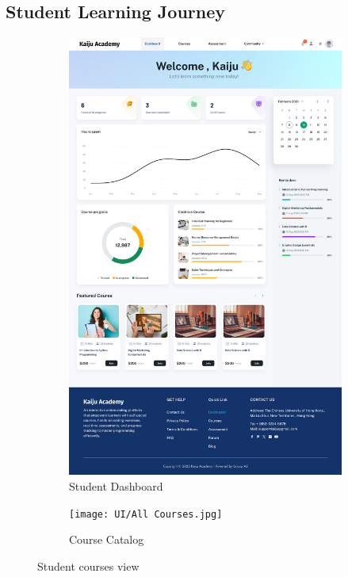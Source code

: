 \documentclass[a4paper, 11pt]{scrreprt}
\begin{document}
\subsection{Student Learning Journey}
\begin{figure}[H]
    \centering
    \begin{subfigure}[b]{0.45\textwidth}
        \centering
        \includegraphics[height=0.4\textheight]{UI/Dashboard.jpg}
        \caption{Student Dashboard}
    \end{subfigure}
    \hfill
    \begin{subfigure}[b]{0.45\textwidth}
        \centering
        \texttt{[image: UI/All Courses.jpg]}
        \caption{Course Catalog}
    \end{subfigure}
    \caption{Student courses view}
\end{figure}
\end{document}
